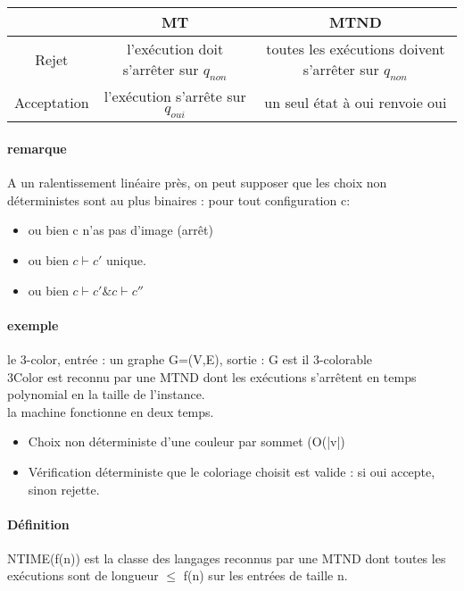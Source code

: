 \documentclass{article}
\begin{document}
\begin{tabular}{|c|c|c|}
\hline 
  & MT & MTND  \\ \hline
Rejet & l'exécution doit s’arrêter sur $q_{non}$ & toutes les exécutions doivent s’arrêter sur $q_{non}$  \\ \hline
Acceptation & l'exécution s’arrête sur $q_{oui}$ & un seul état à oui renvoie oui  \\ \hline
\end{tabular}

\paragraph{remarque} A un ralentissement linéaire près, on peut supposer que les choix non déterministes sont au plus binaires : pour tout configuration c: 
\begin{itemize}
\item ou bien c n'as pas d'image (arrêt)
\item ou bien  $c \vdash c'$ unique.
\item ou bien $ c \vdash c' \& c \vdash c''$
\end{itemize}

\paragraph{exemple } le 3-color, entrée : un graphe G=(V,E), sortie : G est il  3-colorable \\3Color est reconnu par une MTND dont les exécutions s’arrêtent en temps polynomial en la taille de l'instance.\\la machine fonctionne en deux temps.
\begin{itemize}
\item Choix non déterministe d'une couleur par sommet (O(|v|)
\item Vérification déterministe que le coloriage choisit est valide : si oui accepte, sinon rejette.
\end{itemize}

\paragraph{Définition} NTIME(f(n)) est la classe des langages reconnus par une MTND dont toutes les exécutions sont de longueur $\leq$ f(n) sur les entrées de taille n.
\end{document}
